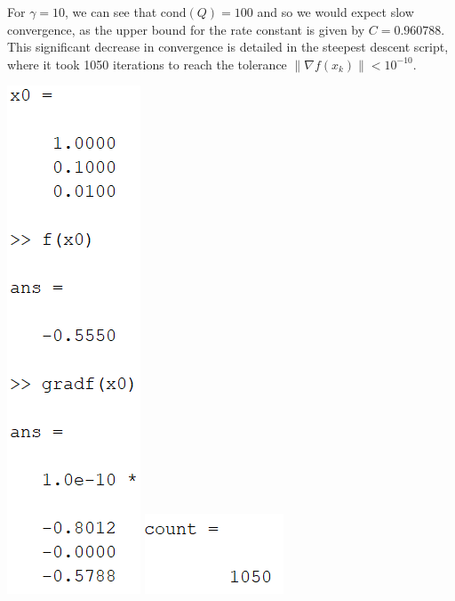 \documentclass{article}
\begin{document}
For $\gamma = 10$, we can see that $\text{cond}(Q) = 100$ and so we would expect slow convergence, as the upper bound for the rate constant is given by $C = 0.960788$. This significant decrease in convergence is detailed in the steepest descent script, where it took 1050 iterations to reach the tolerance $\|\nabla f(x_k) \| < 10^{-10}$.
\begin{center}
    \includegraphics[scale = 0.9]{gamma10vals}
    \newline
    \includegraphics{gamma10count}
    \newline\newline
\end{center}
\end{document}
